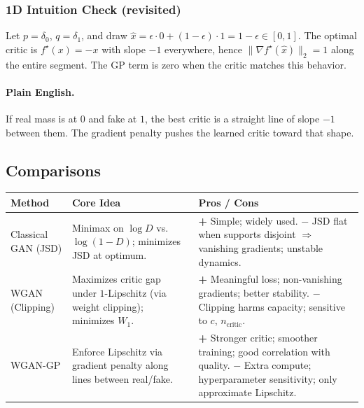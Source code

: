 \documentclass[11pt]{article}
\theoremstyle{remark}
\begin{document}
\subsubsection*{1D Intuition Check (revisited)}
Let $p=\delta_0$, $q=\delta_1$, and draw $\hat{x}=\epsilon\cdot 0 + (1-\epsilon)\cdot 1 = 1-\epsilon \in [0,1]$.
The optimal critic is $f^\star(x)=-x$ with slope $-1$ everywhere, hence $\|\nabla f^\star(\hat{x})\|_2=1$ along the entire segment.
The GP term is zero when the critic matches this behavior.

\paragraph{Plain English.}
If real mass is at $0$ and fake at $1$, the best critic is a straight line of slope $-1$ between them. The gradient penalty pushes the learned critic toward that shape.

\subsection{Comparisons}

\begin{center}
\renewcommand{\arraystretch}{1.15}
\begin{tabular}{@{}p{3.2cm}p{4.6cm}p{6.6cm}@{}}
\toprule
\textbf{Method} & \textbf{Core Idea} & \textbf{Pros / Cons}\\
\midrule
Classical GAN (JSD) &
Minimax on $\log D$ vs.\ $\log(1-D)$; minimizes JSD at optimum. &
\textbf{+} Simple; widely used.\newline
\textbf{$-$} JSD flat when supports disjoint $\Rightarrow$ vanishing gradients; unstable dynamics.\\
\midrule
WGAN (Clipping) &
Maximizes critic gap under $1$-Lipschitz (via weight clipping); minimizes $W_1$. &
\textbf{+} Meaningful loss; non-vanishing gradients; better stability.\newline
\textbf{$-$} Clipping harms capacity; sensitive to $c$, $n_{\text{critic}}$.\\
\midrule
WGAN-GP &
Enforce Lipschitz via gradient penalty along lines between real/fake. &
\textbf{+} Stronger critic; smoother training; good correlation with quality.\newline
\textbf{$-$} Extra compute; hyperparameter sensitivity; only approximate Lipschitz.\\
\bottomrule
\end{tabular}
\end{center}
\end{document}
